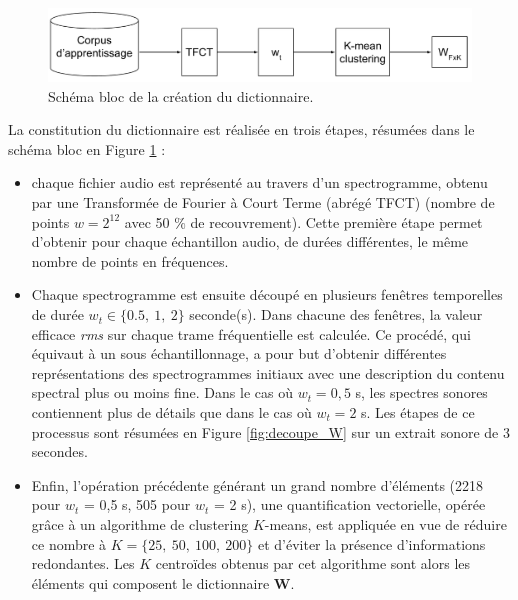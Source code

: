 \begin{figure}[hbtp]
\centering
\includegraphics[width=.9\linewidth]{./figures/NMF/creation_dictionaire.pdf}
\caption{Schéma bloc de la création du dictionnaire.}
\label{fig:creation_W}
\end{figure}

La constitution du dictionnaire est réalisée en trois étapes, résumées dans le schéma bloc en Figure \ref{fig:creation_W} :
\begin{itemize}
\item chaque fichier audio est représenté au travers d'un spectrogramme, obtenu par une Transformée de Fourier à Court Terme (abrégé TFCT) (nombre de points $w = 2^{12}$ avec 50 $\%$ de recouvrement). Cette première étape permet d'obtenir pour chaque échantillon audio, de durées différentes, le même nombre de points en fréquences.
\item Chaque spectrogramme est ensuite découpé en plusieurs fenêtres temporelles de durée $w_t \in \lbrace 0.5,~ 1,~ 2\rbrace$ seconde(s). 
Dans chacune des fenêtres, la valeur efficace \textit{rms} sur chaque trame fréquentielle est calculée. Ce procédé, qui équivaut à un sous échantillonnage, a pour but d'obtenir différentes représentations des spectrogrammes initiaux avec une description du contenu spectral plus ou moins fine. Dans le cas où $w_t = 0,5$ s, les spectres sonores contiennent plus de détails que dans le cas où $w_t = 2$ s. Les étapes de ce processus sont résumées en Figure \ref{fig:decoupe_W} sur un extrait sonore de 3 secondes.
\item Enfin, l'opération précédente générant un grand nombre d'éléments (2218 pour $w_t$ = 0,5 s, 505 pour $w_t$ = 2 s), une quantification vectorielle, opérée grâce à un algorithme de clustering $K$-means, est appliquée en vue de réduire ce nombre à $K = \lbrace 25,~50,~100,~200 \rbrace$ et d'éviter la présence d'informations redondantes. Les $K$ centroïdes obtenus par cet algorithme sont alors les éléments qui composent le dictionnaire $\mathbf{W}$.
\end{itemize}

